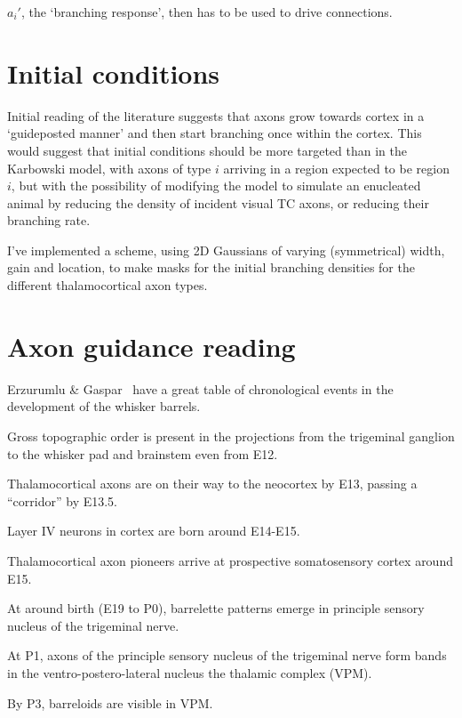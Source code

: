 \documentclass[11pt, a4paper]{article}
\begin{document}
$a_i'$, the `branching response', then has to be used to drive
connections.

\section{Initial conditions}

Initial reading of the literature suggests that axons grow towards
cortex in a `guideposted manner' and then start branching once within
the cortex. This would suggest that initial conditions should be more
targeted than in the Karbowski model, with axons of type $i$ arriving
in a region expected to be region $i$, but with the possibility of
modifying the model to simulate an enucleated animal by reducing the
density of incident visual TC axons, or reducing their branching rate.

I've implemented a scheme, using 2D Gaussians of varying (symmetrical)
width, gain and location, to make masks for the initial branching
densities for the different thalamocortical axon types.

\section{Axon guidance reading}

Erzurumlu \& Gaspar~\cite{erzurumlu_development_2012} have a great
table of chronological events in the development of the whisker
barrels.

Gross topographic order is present in the projections from the
trigeminal ganglion to the whisker pad and brainstem even from E12.

Thalamocortical axons are on their way to the neocortex by E13,
passing a ``corridor'' by E13.5.

Layer IV neurons in cortex are born around E14-E15.

Thalamocortical axon pioneers arrive at prospective somatosensory
cortex around E15.

At around birth (E19 to P0), barrelette patterns emerge in principle
sensory nucleus of the trigeminal nerve.

At P1, axons of the principle sensory nucleus of the trigeminal nerve
form bands in the ventro-postero-lateral nucleus the thalamic complex
(VPM).

By P3, barreloids are visible in VPM.
\end{document}
